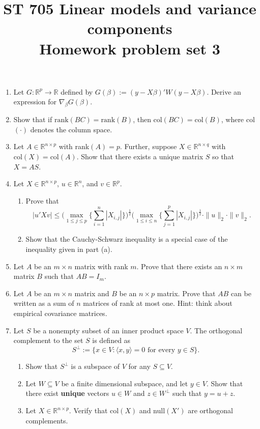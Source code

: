\documentclass[11pt]{article}
\title{ST 705 Linear models and variance components \\ 
        Homework problem set 3}
\begin{document}
\maketitle

\begin{enumerate}


\item Let $G : \mathbb{R}^{p} \to \mathbb{R}$ defined by $G(\beta) := (y - X\beta)'W(y - X\beta)$.  Derive an expression for $\nabla_{\beta}G(\beta)$.

\item Show that if $\text{rank}(BC) = \text{rank}(B)$, then $\text{col}(BC) = \text{col}(B)$, where col$(\cdot)$ denotes the column space.

\item Let $A \in \mathbb{R}^{n\times p}$ with rank$(A) = p$.  Further, suppose  $X \in \mathbb{R}^{n\times q}$ with $\text{col}(X) = \text{col}(A)$.  Show that there exists a unique matrix $S$ so that $X = AS$.

\item Let $X \in \mathbb{R}^{n\times p}$, $u \in \mathbb{R}^{n}$, and $v \in \mathbb{R}^{p}$.  
\begin{enumerate}
\item Prove that
\[
|u'Xv| \le \bigg(\max_{1\le j\le p}\Big\{\sum_{i=1}^{n}|X_{i,j}|\Big\}\bigg)^{\frac{1}{2}} \bigg(\max_{1\le i\le n}\Big\{\sum_{j=1}^{p}|X_{i,j}|\Big\}\bigg)^{\frac{1}{2}} \cdot \|u\|_{2} \cdot \|v\|_{2}.
\]
\item Show that the Cauchy-Schwarz inequality is a special case of the inequality given in part (a).
\end{enumerate}

\item Let $A$ be an $m\times n$ matrix with rank $m$.  Prove that there exists an $n\times m$ matrix $B$ such that $AB = I_{m}$.

\item Let $A$ be an $m\times n$ matrix and $B$ be an $n\times p$ matrix.  Prove that $AB$ can be written as a sum of $n$ matrices of rank at most one.  Hint: think about empirical covariance matrices.   


\item Let $S$ be a nonempty subset of an inner product space $V$.  The orthogonal complement to the set $S$ is defined as
\[
S^{\perp} := \{x \in V : \langle x,y\rangle = 0 \text{ for every } y \in S\}.
\]
\begin{enumerate}
\item Show that $S^{\perp}$ is a subspace of $V$ for any $S \subseteq V$.
\item Let $W \subseteq V$ be a finite dimensional subspace, and let $y \in V$.  Show that there exist \textbf{unique} vectors $u \in W$ and $z \in W^{\perp}$ such that $y = u + z$.
\item Let $X \in \mathbb{R}^{n\times p}$.  Verify that col$(X)$ and null$(X')$ are orthogonal complements.
\end{enumerate}

\end{enumerate}
\end{document}
